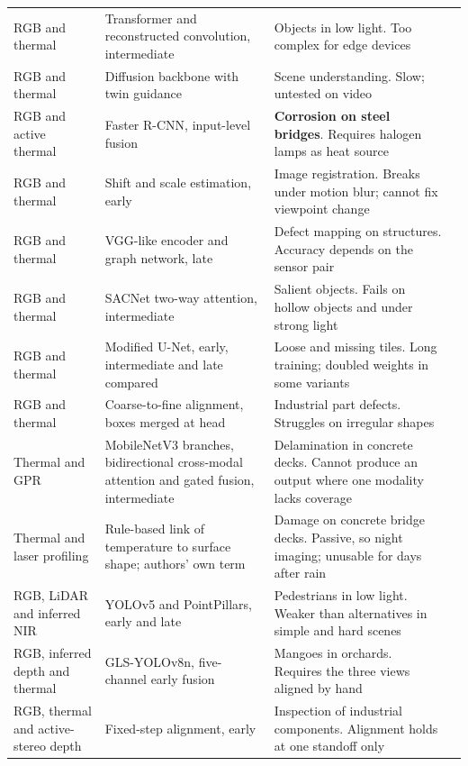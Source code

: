 \begin{xltabular}{\textwidth}{@{}p{2.5cm} X X l@{}}
RGB and thermal & Transformer and reconstructed convolution, intermediate & Objects in low light. Too complex for edge devices & \citep{An2026} \\
RGB and thermal & Diffusion backbone with twin guidance & Scene understanding. Slow; untested on video & \citep{Zhou2026} \\
RGB and active thermal & Faster R-CNN, input-level fusion & \textbf{Corrosion on steel bridges}. Requires halogen lamps as heat source & \citep{Lim2021} \\
RGB and thermal & Shift and scale estimation, early & Image registration. Breaks under motion blur; cannot fix viewpoint change & \citep{Bin2023} \\
RGB and thermal & VGG-like encoder and graph network, late & Defect mapping on structures. Accuracy depends on the sensor pair & \citep{Shahsavarani2024} \\
RGB and thermal & SACNet two-way attention, intermediate & Salient objects. Fails on hollow objects and under strong light & \citep{Wang2024} \\
RGB and thermal & Modified U-Net, early, intermediate and late compared & Loose and missing tiles. Long training; doubled weights in some variants & \citep{Yang2023} \\
RGB and thermal & Coarse-to-fine alignment, boxes merged at head & Industrial part defects. Struggles on irregular shapes & \citep{Li2024c} \\
Thermal and GPR & MobileNetV3 branches, bidirectional cross-modal attention and gated fusion, intermediate & Delamination in concrete decks. Cannot produce an output where one modality lacks coverage & \citep{Rashidi2026} \\
Thermal and laser profiling & Rule-based link of temperature to surface shape; authors' own term & Damage on concrete bridge decks. Passive, so night imaging; unusable for days after rain & \citep{Yamashita2025} \\
RGB, LiDAR and inferred NIR & YOLOv5 and PointPillars, early and late & Pedestrians in low light. Weaker than alternatives in simple and hard scenes & \citep{Wu2025} \\
RGB, inferred depth and thermal & GLS-YOLOv8n, five-channel early fusion & Mangoes in orchards. Requires the three views aligned by hand & \citep{Cao2026} \\
RGB, thermal and active-stereo depth & Fixed-step alignment, early & Inspection of industrial components. Alignment holds at one standoff only & \citep{Nooralishahi2022} \\

\end{xltabular}
